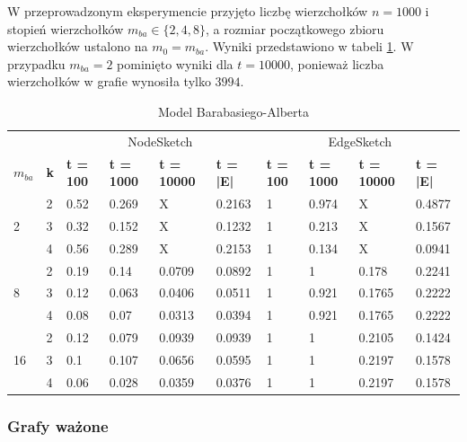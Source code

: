     W przeprowadzonym eksperymencie przyjęto liczbę wierzchołków $n = 1000$ i stopień wierzchołków $m_{ba} \in \{2,4,8\}$, a rozmiar początkowego zbioru wierzchołków ustalono na $m_0 = m_{ba}$. Wyniki przedstawiono w tabeli \ref{tab:barabasi_albert}. W przypadku $m_{ba} = 2$ pominięto wyniki dla $t = 10000$, ponieważ liczba wierzchołków w grafie wynosiła tylko $3994$.
    \begin{table}[!ht]
        \small
        \centering
        \begin{tabular}{|l|l|l|l|l|l|l|l|l|l|}
        \hline
            & & \multicolumn{4}{c|}{NodeSketch} & \multicolumn{4}{c|}{EdgeSketch} \\ \cline{1-10}
            \textbf{$m_{ba}$} & \textbf{k} & \textbf{t = 100} & \textbf{t = 1000} & \textbf{t = 10000} & \textbf{t = |E|} & \textbf{t = 100} & \textbf{t = 1000} & \textbf{t = 10000} & \textbf{t = |E|} \\ \hline\hline
            \multirow{3}{*}{2} & 2 & 0.52 & 0.269 & X & 0.2163 & 1 & 0.974 & X & 0.4877 \\ \cline{2-10}
            & 3 & 0.32 & 0.152 & X & 0.1232 & 1 & 0.213 & X & 0.1567 \\ \cline{2-10}
            & 4 & 0.56 & 0.289 & X & 0.2153 & 1 & 0.134 & X & 0.0941 \\ \hline\hline
            \multirow{3}{*}{8} & 2 & 0.19 & 0.14 & 0.0709 & 0.0892 & 1 & 1 & 0.178 & 0.2241 \\ \cline{2-10}
            & 3 & 0.12 & 0.063 & 0.0406 & 0.0511 & 1 & 0.921 & 0.1765 & 0.2222 \\ \cline{2-10}
            & 4 & 0.08 & 0.07 & 0.0313 & 0.0394 & 1 & 0.921 & 0.1765 & 0.2222 \\ \hline\hline
            \multirow{3}{*}{16} & 2 & 0.12 & 0.079 & 0.0939 & 0.0939 & 1 & 1 & 0.2105 & 0.1424 \\ \cline{2-10}
            & 3 & 0.1 & 0.107 & 0.0656 & 0.0595 & 1 & 1 & 0.2197 & 0.1578 \\ \cline{2-10}
            & 4 & 0.06 & 0.028 & 0.0359 & 0.0376 & 1 & 1 & 0.2197 & 0.1578 \\ \hline
        \end{tabular}
        \caption{Model Barabasiego-Alberta}
        \label{tab:barabasi_albert}
    \end{table}

    \subsubsection{Grafy ważone}

